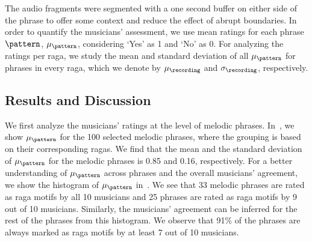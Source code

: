 {The audio fragments were segmented with a one second buffer on either side of the phrase to offer some context and reduce the effect of abrupt boundaries. %
In order to quantify the musicians' assessment, we use mean ratings for each phrase $\pattern$, $\mu_\pattern$, considering `Yes' as 1 and `No' as 0. For analyzing the ratings per \gls{raga}, we study the mean and standard deviation of all $\mu_\pattern$ for phrases in every \gls{raga}, which we denote by $\mu_\recording$ and $\sigma_\recording$, respectively.


\subsection{Results and Discussion}
\label{sec:patterns_characterization_results_and_discussion}

We first analyze the musicians' ratings at the level of melodic phrases. In~, we show $\mu_\pattern$ for the 100 selected melodic phrases, where the grouping is based on their corresponding \glspl{raga}. We find that the mean and the standard deviation of $\mu_\pattern$ for the melodic phrases is 0.85 and 0.16, respectively. For a better understanding of $\mu_\pattern$ across phrases and the overall musicians' agreement, we show the histogram of $\mu_\pattern$ in~. We see that 33 melodic phrases are rated as \gls{raga} motifs by all 10 musicians and 25 phrases are rated as \gls{raga} motifs by 9 out of 10 musicians. Similarly, the musicians' agreement can be inferred for the rest of the phrases from this histogram. We observe that 91\% of the phrases are always marked as \gls{raga} motifs by at least 7 out of 10 musicians. 


}
